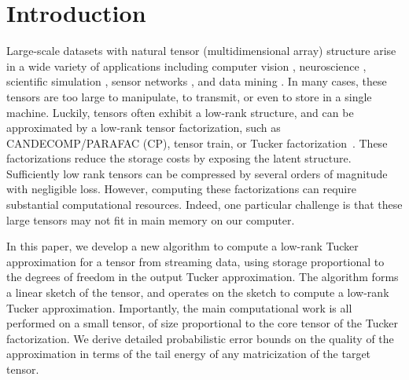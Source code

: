 \section{Introduction}

Large-scale datasets with natural tensor (multidimensional array) structure
arise in a wide variety of applications including
computer vision \cite{vasilescu2002multilinear},
neuroscience \cite{cichocki2013tensor},
scientific simulation \cite{austin2016parallel},
sensor networks \cite{sun2008incremental},
and data mining \cite{kolda2008scalable}.
In many cases, these tensors are too large to manipulate, to transmit,
or even to store in a single machine.
Luckily, tensors often exhibit a low-rank structure,
and can be approximated by a low-rank tensor factorization,
such as CANDECOMP/PARAFAC (CP), tensor train, or Tucker factorization~\cite{kolda2009tensor}.
These factorizations reduce the storage costs
by exposing the latent structure.
Sufficiently low rank tensors can be compressed by several orders of magnitude
with negligible loss.
However, computing these factorizations can require
substantial computational resources.
Indeed, one particular challenge is that these large tensors
may not fit in main memory on our computer.

In this paper, we develop a new algorithm to compute a low-rank Tucker
approximation for a tensor from streaming data,
using storage proportional to the degrees of freedom in the output Tucker approximation.
The algorithm forms a linear sketch of the tensor,
and operates on the sketch to compute a low-rank Tucker approximation.
Importantly, the main computational work is all performed on
a small tensor, of size proportional to the core tensor of the Tucker factorization.
We derive detailed probabilistic error bounds on the quality of the approximation
in terms of the tail energy of any matricization of the target tensor.

